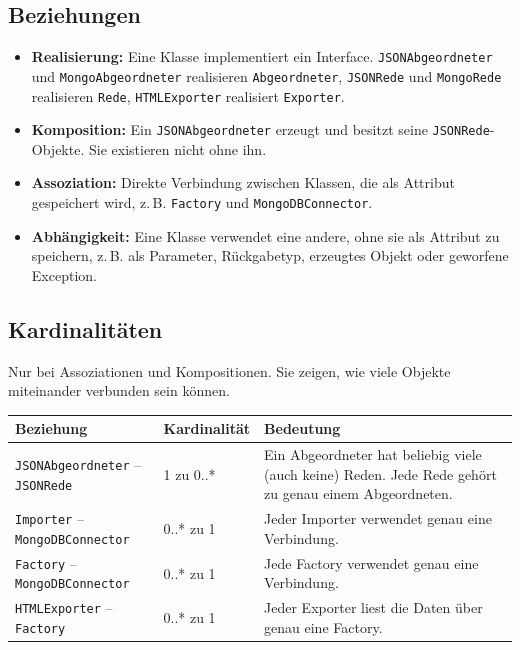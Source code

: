 

\subsection{Beziehungen}
\begin{itemize}
    \item \textbf{Realisierung:} Eine Klasse implementiert ein Interface. \texttt{JSONAbgeordneter} und \texttt{MongoAbgeordneter} realisieren \texttt{Abgeordneter}, \texttt{JSONRede} und \texttt{MongoRede} realisieren \texttt{Rede}, \texttt{HTMLExporter} realisiert \texttt{Exporter}.
    \item \textbf{Komposition:} Ein \texttt{JSONAbgeordneter} erzeugt und besitzt seine \texttt{JSONRede}-Objekte. Sie existieren nicht ohne ihn.
    \item \textbf{Assoziation:} Direkte Verbindung zwischen Klassen, die als Attribut gespeichert wird, z.\,B. \texttt{Factory} und \texttt{MongoDBConnector}.
    \item \textbf{Abhängigkeit:} Eine Klasse verwendet eine andere, ohne sie als Attribut zu speichern, z.\,B. als Parameter, Rückgabetyp, erzeugtes Objekt oder geworfene Exception.
\end{itemize}

\subsection{Kardinalitäten}
Nur bei Assoziationen und Kompositionen. Sie zeigen, wie viele Objekte miteinander verbunden sein können.

\begin{center}
\begin{tabular}{|p{4.2cm}|p{2.5cm}|p{8.5cm}|}
\hline
\textbf{Beziehung} & \textbf{Kardinalität} & \textbf{Bedeutung} \\ \hline
\texttt{JSONAbgeordneter} -- \texttt{JSONRede} & 1 zu 0..* & Ein Abgeordneter hat beliebig viele (auch keine) Reden. Jede Rede gehört zu genau einem Abgeordneten. \\ \hline
\texttt{Importer} -- \texttt{MongoDBConnector} & 0..* zu 1 & Jeder Importer verwendet genau eine Verbindung. \\ \hline
\texttt{Factory} -- \texttt{MongoDBConnector} & 0..* zu 1 & Jede Factory verwendet genau eine Verbindung. \\ \hline
\texttt{HTMLExporter} -- \texttt{Factory} & 0..* zu 1 & Jeder Exporter liest die Daten über genau eine Factory. \\ \hline
\end{tabular}
\end{center}

